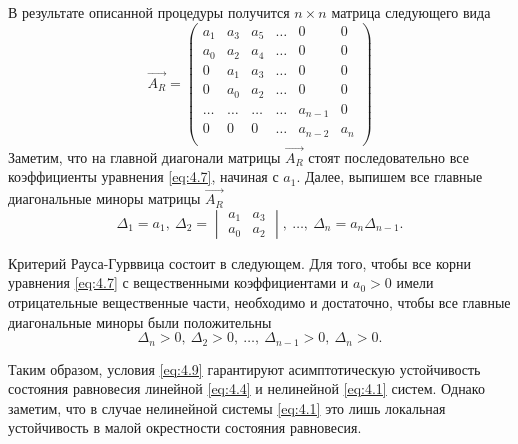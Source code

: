 В результате описанной процедуры получится $n\times n$ матрица следующего вида
\begin{equation}
        \label{eq:}
        \vec{A_R} = 
        \begin{pmatrix}
                a_1 & a_3 & a_5 & \dots & 0 & 0 \\
                a_0 & a_2 & a_4 & \dots & 0 & 0 \\
                0 & a_1 & a_3 & \dots & 0 & 0 \\
                0 & a_0 & a_2 & \dots & 0 & 0 \\
                \dots & \dots & \dots & \dots & a_{n-1} & 0 \\
                0 & 0 &0 & \dots & a_{n-2} & a_n \\
        \end{pmatrix}
\end{equation}
Заметим, что на главной диагонали матрицы $\vec{A_R}$ стоят последовательно все коэффициенты уравнения \eqref{eq:4.7}, начиная с $a_1$. Далее, выпишем все главные диагональные миноры матрицы $\vec{A_R}$ 
\begin{equation}
        \label{eq:4.8}
        \Delta_1 = a_1, ~ 
        \Delta_2 = 
        \begin{vmatrix}
                a_1 & a_3 \\
                a_0 & a_2
        \end{vmatrix}, ~ 
        \dots, ~
        \Delta_n = a_n \Delta_{n-1}.
\end{equation}

Критерий Рауса-Гурввица состоит в следующем. Для того, чтобы все корни уравнения \eqref{eq:4.7} с вещественными коэффициентами и $a_0>0$ имели отрицательные вещественные части, необходимо и достаточно, чтобы все главные диагональные миноры были положительны
\begin{equation}
        \label{eq:4.9}
        \Delta_n > 0,~\Delta_2> 0, ~ \dots,~\Delta_{n-1}>0,~\Delta_n >0.
\end{equation}

Таким образом, условия \eqref{eq:4.9} гарантируют асимптотическую устойчивость состояния равновесия линейной \eqref{eq:4.4} и нелинейной \eqref{eq:4.1} систем. Однако заметим, что в случае нелинейной системы \eqref{eq:4.1} это лишь локальная устойчивость в малой окрестности состояния равновесия.


